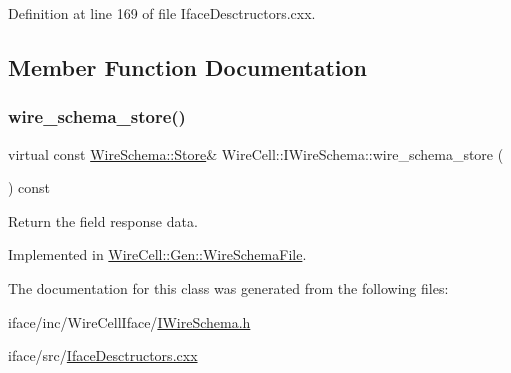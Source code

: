 Definition at line 169 of file Iface\+Desctructors.\+cxx.



\subsection{Member Function Documentation}
\mbox{\label{class_wire_cell_1_1_i_wire_schema_a054538cf0ab8dbfd7b5d2a0064304c08}} 
\subsubsection{\texorpdfstring{wire\+\_\+schema\+\_\+store()}{wire\_schema\_store()}}
{\footnotesize\ttfamily virtual const \hyperlink{class_wire_cell_1_1_wire_schema_1_1_store}{Wire\+Schema\+::\+Store}\& Wire\+Cell\+::\+I\+Wire\+Schema\+::wire\+\_\+schema\+\_\+store (\begin{DoxyParamCaption}{ }\end{DoxyParamCaption}) const\hspace{0.3cm}{\ttfamily [pure virtual]}}



Return the field response data. 



Implemented in \hyperlink{class_wire_cell_1_1_gen_1_1_wire_schema_file_a127d3bf1f678722d248cce569141a69e}{Wire\+Cell\+::\+Gen\+::\+Wire\+Schema\+File}.



The documentation for this class was generated from the following files\+:\begin{DoxyCompactItemize}
\item 
iface/inc/\+Wire\+Cell\+Iface/\hyperlink{_i_wire_schema_8h}{I\+Wire\+Schema.\+h}\item 
iface/src/\hyperlink{_iface_desctructors_8cxx}{Iface\+Desctructors.\+cxx}\end{DoxyCompactItemize}
